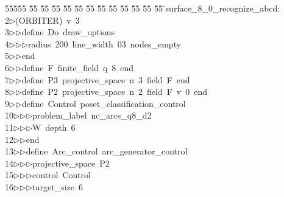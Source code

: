 %
%
\begin{tabbing}
55555 \= 55 \= 55 \= 55 \= 55 \= 55 \= 55 \= 55 \= 55 \= 55 \= 55 \= 55 \= 55 \= \>surface\_8\_0\_recognize\_abcd:\\[0pt]
2\>$\triangleright$\>(ORBITER)\ v\ 3\ \\[0pt]
3\>$\triangleright$\>$\triangleright$\>define\ Do\ draw\_options\ \\[0pt]
4\>$\triangleright$\>$\triangleright$\>$\triangleright$\>radius\ 200\ line\_width\ 03\ nodes\_empty\ \\[0pt]
5\>$\triangleright$\>$\triangleright$\>end\ \\[0pt]
6\>$\triangleright$\>$\triangleright$\>define\ F\ finite\_field\ q\ 8\ end\ \\[0pt]
7\>$\triangleright$\>$\triangleright$\>define\ P3\ projective\_space\ n\ 3\ field\ F\ end\ \\[0pt]
8\>$\triangleright$\>$\triangleright$\>define\ P2\ projective\_space\ n\ 2\ field\ F\ v\ 0\ end\ \\[0pt]
9\>$\triangleright$\>$\triangleright$\>define\ Control\ poset\_classification\_control\ \\[0pt]
10\>$\triangleright$\>$\triangleright$\>$\triangleright$\>problem\_label\ nc\_arcs\_q8\_d2\ \\[0pt]
11\>$\triangleright$\>$\triangleright$\>$\triangleright$\>W\ depth\ 6\ \\[0pt]
12\>$\triangleright$\>$\triangleright$\>end\ \\[0pt]
13\>$\triangleright$\>$\triangleright$\>define\ Arc\_control\ arc\_generator\_control\ \\[0pt]
14\>$\triangleright$\>$\triangleright$\>$\triangleright$\>projective\_space\ P2\ \\[0pt]
15\>$\triangleright$\>$\triangleright$\>$\triangleright$\>control\ Control\ \\[0pt]
16\>$\triangleright$\>$\triangleright$\>$\triangleright$\>target\_size\ 6\ \\[0pt]

\end{tabbing}
